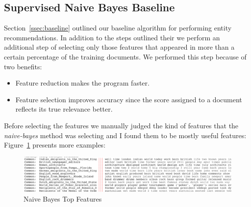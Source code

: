 \documentclass{article}
\newcommand{\figref}[1]{Figure~\ref{#1}}
\newcommand{\secref}[1]{Section~\ref{#1}}
\begin{document}
\subsection{Supervised Naive Bayes Baseline}
\label{ssec:results-nb}
\secref{ssec:baseline} outlined our baseline algorithm for performing entity
recommendations. In addition to the steps outlined their we perform an
additional step of selecting only those features that appeared in more than a certain
percentage of the training documents. We performed this step because of two benefits:
\begin{itemize}
\item Feature reduction makes the program faster.
\item Feature selection improves accuracy since the score assigned to a document reflects its true relevance better.
\end{itemize}
Before selecting the features we manually judged the kind of features that the
\textit{naive-bayes} method was selecting and I found them to be mostly useful features:
\figref{fig:nb-feature-analysis} presents more examples:
\begin{figure}[htbp]
  \begin{adjustwidth}{-5.5cm}{}
  \includegraphics[width=1.18\linewidth]{figures/feature_analysis.png}
  \caption{Naive Bayes Top Features}
  \label{fig:nb-feature-analysis}
\end{adjustwidth}
\end{figure}
\end{document}
